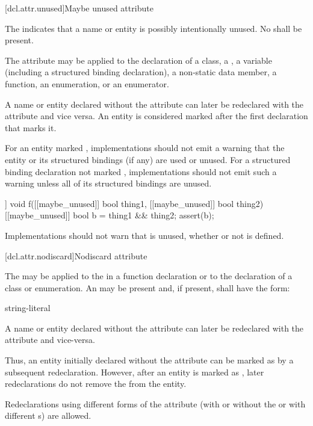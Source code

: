 [dcl.attr.unused]{Maybe unused attribute}%

\pnum
The  
indicates that a name or entity is possibly intentionally unused.
No  shall be present.

\pnum
The attribute may be applied to the declaration of a class,
a ,
a variable (including a structured binding declaration),
a non-static data member,
a function, an enumeration, or an enumerator.

\pnum
A name or entity declared without the  attribute
can later be redeclared with the attribute
and vice versa.
An entity is considered marked
after the first declaration that marks it.

\pnum
\recommended
For an entity marked ,
implementations should not emit a warning
that the entity or its structured bindings (if any)
are used or unused.
For a structured binding declaration not marked ,
implementations should not emit such a warning unless
all of its structured bindings are unused.

\pnum
\begin{example}
\begin{codeblock}
[[maybe_unused]] void f([[maybe_unused]] bool thing1,
                        [[maybe_unused]] bool thing2) {
  [[maybe_unused]] bool b = thing1 && thing2;
  assert(b);
}
\end{codeblock}
Implementations should not warn that  is unused,
whether or not  is defined.
\end{example}

[dcl.attr.nodiscard]{Nodiscard attribute}%

\pnum
The  
may be applied to the 
in a function declaration or to the declaration of a class or enumeration.
An  may be present
and, if present, shall have the form:

\begin{ncbnf}
\terminal{(} string-literal \terminal{)}
\end{ncbnf}

\pnum
A name or entity declared without the  attribute
can later be redeclared with the attribute and vice-versa.
\begin{note}
Thus, an entity initially declared without the attribute
can be marked as 
by a subsequent redeclaration.
However, after an entity is marked as ,
later redeclarations do not remove the 
from the entity.
\end{note}
Redeclarations using different forms of the attribute
(with or without the 
or with different s)
are allowed.

